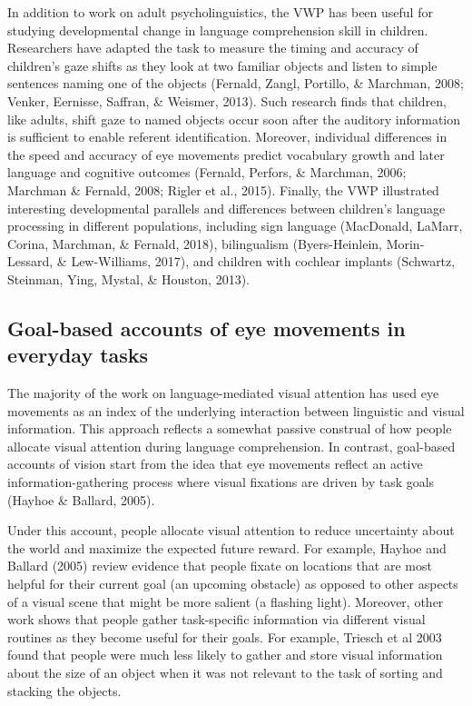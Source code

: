 \documentclass[english,floatsintext,man]{apa6}
\begin{document}
In addition to work on adult psycholinguistics, the VWP has been useful
for studying developmental change in language comprehension skill in
children. Researchers have adapted the task to measure the timing and
accuracy of children's gaze shifts as they look at two familiar objects
and listen to simple sentences naming one of the objects (Fernald,
Zangl, Portillo, \& Marchman, 2008; Venker, Eernisse, Saffran, \&
Weismer, 2013). Such research finds that children, like adults, shift
gaze to named objects occur soon after the auditory information is
sufficient to enable referent identification. Moreover, individual
differences in the speed and accuracy of eye movements predict
vocabulary growth and later language and cognitive outcomes (Fernald,
Perfors, \& Marchman, 2006; Marchman \& Fernald, 2008; Rigler et al.,
2015). Finally, the VWP illustrated interesting developmental parallels
and differences between children's language processing in different
populations, including sign language (MacDonald, LaMarr, Corina,
Marchman, \& Fernald, 2018), bilingualism (Byers-Heinlein,
Morin-Lessard, \& Lew-Williams, 2017), and children with cochlear
implants (Schwartz, Steinman, Ying, Mystal, \& Houston, 2013).

\hypertarget{goal-based-accounts-of-eye-movements-in-everyday-tasks}{%
\subsection{Goal-based accounts of eye movements in everyday
tasks}\label{goal-based-accounts-of-eye-movements-in-everyday-tasks}}

The majority of the work on language-mediated visual attention has used
eye movements as an index of the underlying interaction between
linguistic and visual information. This approach reflects a somewhat
passive construal of how people allocate visual attention during
language comprehension. In contrast, goal-based accounts of vision start
from the idea that eye movements reflect an active information-gathering
process where visual fixations are driven by task goals (Hayhoe \&
Ballard, 2005).

Under this account, people allocate visual attention to reduce
uncertainty about the world and maximize the expected future reward. For
example, Hayhoe and Ballard (2005) review evidence that people fixate on
locations that are most helpful for their current goal (an upcoming
obstacle) as opposed to other aspects of a visual scene that might be
more salient (a flashing light). Moreover, other work shows that people
gather task-specific information via different visual routines as they
become useful for their goals. For example, Triesch et al 2003 found
that people were much less likely to gather and store visual information
about the size of an object when it was not relevant to the task of
sorting and stacking the objects.
\end{document}
